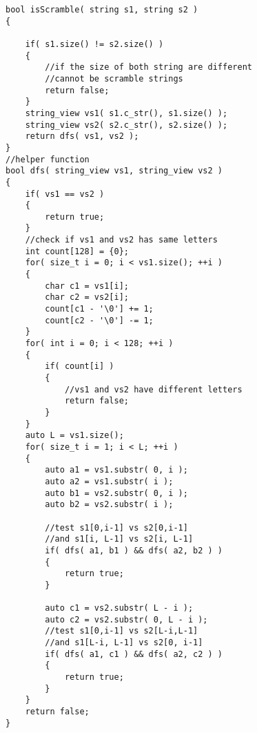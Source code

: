 \setcounter{lstlisting}{0}
\begin{lstlisting}[style=customc, caption={Recursion}]
bool isScramble( string s1, string s2 )
{

    if( s1.size() != s2.size() )
    {
        //if the size of both string are different
        //cannot be scramble strings
        return false;
    }
    string_view vs1( s1.c_str(), s1.size() );
    string_view vs2( s2.c_str(), s2.size() );
    return dfs( vs1, vs2 );
}
//helper function
bool dfs( string_view vs1, string_view vs2 )
{
    if( vs1 == vs2 )
    {
        return true;
    }
    //check if vs1 and vs2 has same letters
    int count[128] = {0};
    for( size_t i = 0; i < vs1.size(); ++i )
    {
        char c1 = vs1[i];
        char c2 = vs2[i];
        count[c1 - '\0'] += 1;
        count[c2 - '\0'] -= 1;
    }
    for( int i = 0; i < 128; ++i )
    {
        if( count[i] )
        {
            //vs1 and vs2 have different letters
            return false;
        }
    }
    auto L = vs1.size();
    for( size_t i = 1; i < L; ++i )
    {
        auto a1 = vs1.substr( 0, i );
        auto a2 = vs1.substr( i );
        auto b1 = vs2.substr( 0, i );
        auto b2 = vs2.substr( i );

        //test s1[0,i-1] vs s2[0,i-1]
        //and s1[i, L-1] vs s2[i, L-1]
        if( dfs( a1, b1 ) && dfs( a2, b2 ) )
        {
            return true;
        }

        auto c1 = vs2.substr( L - i );
        auto c2 = vs2.substr( 0, L - i );
        //test s1[0,i-1] vs s2[L-i,L-1]
        //and s1[L-i, L-1] vs s2[0, i-1]
        if( dfs( a1, c1 ) && dfs( a2, c2 ) )
        {
            return true;
        }
    }
    return false;
}
\end{lstlisting}
